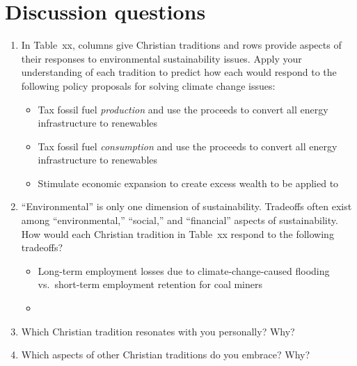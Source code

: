 \documentclass[12pt]{article}
\begin{document}
\appendix

\section{Discussion questions}
\label{sec:discussion_questions}

%
\begin{enumerate}

  \item In Table~xx, columns give Christian traditions
        and rows provide aspects of their responses
		to environmental sustainability issues. 
		Apply your understanding of each tradition to 
		predict how each would respond to the following policy proposals
		for solving climate change issues:
		\begin{itemize}

		  \item Tax fossil fuel \emph{production} and use the proceeds to 
		        convert all energy infrastructure to renewables
		  
		  \item Tax fossil fuel \emph{consumption} and use the proceeds to 
		        convert all energy infrastructure to renewables

		  \item Stimulate economic expansion to create excess wealth to be applied to 

		\end{itemize}
  \item ``Environmental'' is only one dimension of sustainability. 
        Tradeoffs often exist among ``environmental,'' ``social,'' and ``financial'' 
		aspects of sustainability. 
		How would each Christian tradition in Table~xx respond to the following tradeoffs?
		\begin{itemize}

		  \item Long-term employment losses due to climate-change-caused flooding vs.\ 
		        short-term employment retention for coal miners

		  \item

		\end{itemize}
  \item Which Christian tradition resonates with you personally? Why?
  
  \item Which aspects of other Christian traditions do you embrace? Why?


\end{enumerate}
\end{document}

